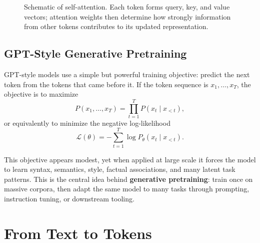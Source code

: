 \documentclass[12pt]{article}
\begin{document}
\begin{figure}[ht]
    \caption{Schematic of self-attention. Each token forms query, key, and value vectors; attention weights then determine how strongly information from other tokens contributes to its updated representation.}
    \label{t15fig:self_attention}
\end{figure}
\subsection{GPT-Style Generative Pretraining}

GPT-style models use a simple but powerful training objective: predict the next token from the tokens that came before it. If the token sequence is $x_1,\dots,x_T$, the objective is to maximize
\begin{equation}
    P(x_1,\dots,x_T) = \prod_{t=1}^T P(x_t \mid x_{<t}),
    \label{t15eq:autoregressive}
\end{equation}
or equivalently to minimize the negative log-likelihood
\begin{equation}
    \mathcal{L}(\theta) = -\sum_{t=1}^T \log P_\theta(x_t \mid x_{<t}).
    \label{t15eq:nll}
\end{equation}

This objective appears modest, yet when applied at large scale it forces the model to learn syntax, semantics, style, factual associations, and many latent task patterns. This is the central idea behind \textbf{generative pretraining}: train once on massive corpora, then adapt the same model to many tasks through prompting, instruction tuning, or downstream tooling.

\section{From Text to Tokens}
\end{document}

